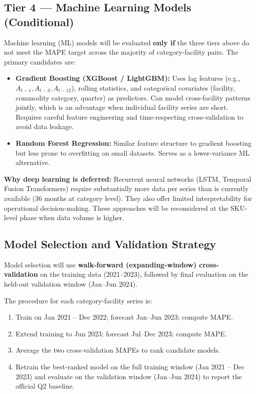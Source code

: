 \documentclass[12pt, a4paper]{article}
\begin{document}
\subsection{Tier 4 --- Machine Learning Models (Conditional)}

Machine learning (ML) models will be evaluated \textbf{only if} the
three tiers above do not meet the MAPE target across the majority of
category-facility pairs. The primary candidates are:

\begin{itemize}[leftmargin=1.5em, itemsep=4pt]
  \item \textbf{Gradient Boosting (XGBoost / LightGBM):} Uses lag
        features (e.g., $A_{t-1}, A_{t-3}, A_{t-12}$), rolling
        statistics, and categorical covariates (facility, commodity
        category, quarter) as predictors. Can model cross-facility
        patterns jointly, which is an advantage when individual facility
        series are short. Requires careful feature engineering and
        time-respecting cross-validation to avoid data leakage.

  \item \textbf{Random Forest Regression:} Similar feature structure to
        gradient boosting but less prone to overfitting on small datasets.
        Serves as a lower-variance ML alternative.
\end{itemize}

\begin{mdframed}[style=notebox]
\textbf{Why deep learning is deferred:} Recurrent neural networks (LSTM,
Temporal Fusion Transformers) require substantially more data per series
than is currently available (36 months at category level). They also offer
limited interpretability for operational decision-making. These approaches
will be reconsidered at the SKU-level phase when data volume is higher.
\end{mdframed}

\subsection{Model Selection and Validation Strategy}

Model selection will use \textbf{walk-forward (expanding-window)
cross-validation} on the training data (2021--2023), followed by final
evaluation on the held-out validation window (Jan--Jun 2024).

The procedure for each category-facility series is:

\begin{enumerate}[leftmargin=1.5em, itemsep=4pt]
  \item Train on Jan 2021 -- Dec 2022; forecast Jan--Jun 2023; compute MAPE.
  \item Extend training to Jun 2023; forecast Jul--Dec 2023; compute MAPE.
  \item Average the two cross-validation MAPEs to rank candidate models.
  \item Retrain the best-ranked model on the full training window
        (Jan 2021 -- Dec 2023) and evaluate on the validation window
        (Jan--Jun 2024) to report the official Q2 baseline.
\end{enumerate}
\end{document}
